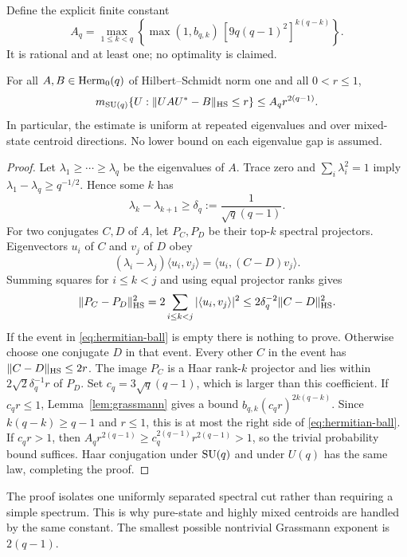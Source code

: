 Define the explicit finite constant
\begin{equation}\label{eq:Aq}
 A_q=\max_{1\le k<q}
 \left\{\max(1,b_{q,k})\,[9q(q-1)^2]^{k(q-k)}\right\}.
\end{equation}
It is rational and at least one; no optimality is claimed.
\begin{theorem}
\label{thm:all-spectra}
For all $A,B\in\operatorname{Herm}_0(q)$ of Hilbert--Schmidt norm one and all
$0<r\le1$,
\begin{equation}\label{eq:hermitian-ball}
 m_{\operatorname{SU}(q)}\{U:\lVert UAU^*-B\rVert_{\mathrm{HS}}\le r\}
                        \le A_q r^{2(q-1)}.
\end{equation}
In particular, the estimate is uniform at repeated eigenvalues and over
mixed-state centroid directions. No lower bound on each eigenvalue gap
is assumed.
\end{theorem}
\begin{proof}
Let $\lambda_1\ge\cdots\ge\lambda_q$ be the eigenvalues of $A$.
Trace zero and $\sum_i\lambda_i^2=1$ imply
$\lambda_1-\lambda_q\ge q^{-1/2}$. Hence some $k$ has
\begin{equation}\label{eq:eigengap}
 \lambda_k-\lambda_{k+1}\ge\delta_q:=\frac1{\sqrt q(q-1)}.
\end{equation}
For two conjugates $C,D$ of $A$, let $P_C,P_D$ be their top-$k$
spectral projectors. Eigenvectors $u_i$ of $C$ and $v_j$ of $D$ obey
\[
 (\lambda_i-\lambda_j)\langle u_i,v_j\rangle
        =\langle u_i,(C-D)v_j\rangle.
\]
Summing squares for $i\le k<j$ and using equal projector ranks gives
\begin{equation}\label{eq:projector-stability}
 \lVert P_C-P_D\rVert_{\mathrm{HS}}^2
 =2\sum_{i\le k<j}|\langle u_i,v_j\rangle|^2
 \le 2\delta_q^{-2}\lVert C-D\rVert_{\mathrm{HS}}^2.
\end{equation}
If the event in \eqref{eq:hermitian-ball} is empty there is nothing to
prove. Otherwise choose one conjugate $D$ in that event. Every other
$C$ in the event has $\lVert C-D\rVert_{\mathrm{HS}}\le2r$. The image $P_C$ is a
Haar rank-$k$ projector and lies within $2\sqrt2\delta_q^{-1}r$ of
$P_D$. Set $c_q=3\sqrt q(q-1)$, which is larger than this coefficient.
If $c_qr\le1$, Lemma~\ref{lem:grassmann} gives a bound
$b_{q,k}(c_qr)^{2k(q-k)}$. Since $k(q-k)\ge q-1$ and $r\le1$,
this is at most the right side of \eqref{eq:hermitian-ball}.
If $c_qr>1$, then $A_qr^{2(q-1)}\ge c_q^{2(q-1)}r^{2(q-1)}>1$,
so the trivial probability bound suffices. Haar conjugation under
$\operatorname{SU}(q)$ and under $U(q)$ has the same law, completing the proof.
\end{proof}
The proof isolates one uniformly separated spectral cut rather than
requiring a simple spectrum. This is why pure-state and highly mixed
centroids are handled by the same constant. The smallest possible
nontrivial Grassmann exponent is $2(q-1)$.

